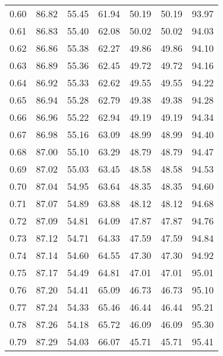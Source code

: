 \begin{tabular}{|c|c|c|c|c|c|c|}
      0.60 &     86.82 &     55.45 &      61.94 &   50.19 &      50.19 &         93.97 \\
      0.61 &     86.83 &     55.40 &      62.08 &   50.02 &      50.02 &         94.03 \\
      0.62 &     86.86 &     55.38 &      62.27 &   49.86 &      49.86 &         94.10 \\
      0.63 &     86.89 &     55.36 &      62.45 &   49.72 &      49.72 &         94.16 \\
      0.64 &     86.92 &     55.33 &      62.62 &   49.55 &      49.55 &         94.22 \\
      0.65 &     86.94 &     55.28 &      62.79 &   49.38 &      49.38 &         94.28 \\
      0.66 &     86.96 &     55.22 &      62.94 &   49.19 &      49.19 &         94.34 \\
      0.67 &     86.98 &     55.16 &      63.09 &   48.99 &      48.99 &         94.40 \\
      0.68 &     87.00 &     55.10 &      63.29 &   48.79 &      48.79 &         94.47 \\
      0.69 &     87.02 &     55.03 &      63.45 &   48.58 &      48.58 &         94.53 \\
      0.70 &     87.04 &     54.95 &      63.64 &   48.35 &      48.35 &         94.60 \\
      0.71 &     87.07 &     54.89 &      63.88 &   48.12 &      48.12 &         94.68 \\
      0.72 &     87.09 &     54.81 &      64.09 &   47.87 &      47.87 &         94.76 \\
      0.73 &     87.12 &     54.71 &      64.33 &   47.59 &      47.59 &         94.84 \\
      0.74 &     87.14 &     54.60 &      64.55 &   47.30 &      47.30 &         94.92 \\
      0.75 &     87.17 &     54.49 &      64.81 &   47.01 &      47.01 &         95.01 \\
      0.76 &     87.20 &     54.41 &      65.09 &   46.73 &      46.73 &         95.10 \\
      0.77 &     87.24 &     54.33 &      65.46 &   46.44 &      46.44 &         95.21 \\
      0.78 &     87.26 &     54.18 &      65.72 &   46.09 &      46.09 &         95.30 \\
      0.79 &     87.29 &     54.03 &      66.07 &   45.71 &      45.71 &         95.41 \\

\end{tabular}
